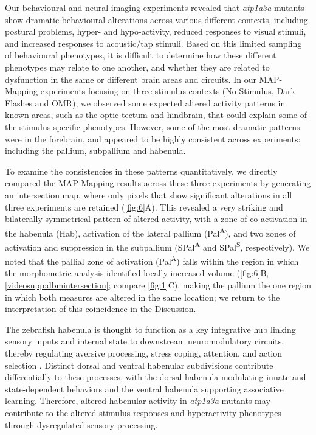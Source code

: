 \documentclass[9.5pt,lineno]{RandlettLab_elife}
\begin{document}
Our behavioural and neural imaging experiments revealed that \emph{atp1a3a} mutants show dramatic behavioural alterations across various different contexts, including postural problems, hyper- and hypo-activity, reduced responses to visual stimuli, and increased responses to acoustic/tap stimuli. 
Based on this limited sampling of behavioural phenotypes, it is difficult to determine how these different phenotypes may relate to one another, and whether they are related to dysfunction in the same or different brain areas and circuits.
In our MAP-Mapping experiments focusing on three stimulus contexts (No Stimulus, Dark Flashes and OMR), we observed some expected altered activity patterns in known areas, such as the optic tectum and hindbrain, that could explain some of the stimulus-specific phenotypes.
However, some of the most dramatic patterns were in the forebrain, and appeared to be highly consistent across experiments: including the pallium, subpallium and habenula. 

To examine the consistencies in these patterns quantitatively, we directly compared the MAP-Mapping results across these three experiments by generating an intersection map, where only pixels that show significant alterations in all three experiments are retained (\autoref{fig:6}A).
This revealed a very striking and bilaterally symmetrical pattern of altered activity, with a zone of co-activation in the habenula (Hab), activation of the lateral pallium (Pal\textsuperscript{A}), and two zones of activation and suppression in the subpallium (SPal\textsuperscript{A} and SPal\textsuperscript{S}, respectively).
We noted that the pallial zone of activation (Pal\textsuperscript{A}) falls within the region in which the morphometric analysis identified locally increased volume (\autoref{fig:6}B, \autoref{videosupp:dbmintersection}; compare \autoref{fig:1}C), making the pallium the one region in which both measures are altered in the same location; we return to the interpretation of this coincidence in the Discussion.

The zebrafish habenula is thought to function as a key integrative hub linking sensory inputs and internal state to downstream neuromodulatory circuits, thereby regulating aversive processing, stress coping, attention, and action selection \citep{Okamoto2021}. 
Distinct dorsal and ventral habenular subdivisions contribute differentially to these processes, with the dorsal habenula modulating innate and state-dependent behaviors and the ventral habenula supporting associative learning.
Therefore, altered habenular activity in \emph{atp1a3a} mutants may contribute to the altered stimulus responses and hyperactivity phenotypes through dysregulated sensory processing.
\end{document}

